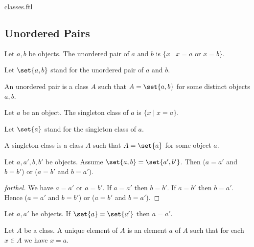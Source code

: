 \documentclass{naproche-library}
\begin{document}
\begin{smodule}{classes.ftl}
  \subsection*{Unordered Pairs}

  \begin{definition}[forthel,id=FOUNDATIONS_01_3471035364016128]
    Let $a, b$ be objects.
    The unordered pair of $a$ and $b$ is $\{ x \mid x = a$ or $x = b \}$.

    Let $\set{a, b}$ stand for the unordered pair of $a$ and $b$.
  \end{definition}

  \begin{definition}[forthel,id=FOUNDATIONS_01_605432672419840]
    An unordered pair is a class $A$ such that $A = \set{a, b}$ for some distinct objects $a, b$.
  \end{definition}

  \begin{definition}[forthel,id=FOUNDATIONS_01_1160414603771904]
    Let $a$ be an object.
    The singleton class of $a$ is $\{ x \mid x = a \}$.

    Let $\set{a}$ stand for the singleton class of $a$.
  \end{definition}

  \begin{definition}[forthel,id=FOUNDATIONS_01_6786618161627136]
    A singleton class is a class $A$ such that $A = \set{a}$ for some object $a$.
  \end{definition}

  \begin{proposition}[forthel,id=FOUNDATIONS_01_6125259604361216]
    Let $a, a', b, b'$ be objects.
    Assume $\set{a, b} = \set{a', b'}$.
    Then ($a = a'$ and $b = b'$) or ($a = b'$ and $b = a'$).
  \end{proposition}
  \begin{proof}[forthel]
    We have $a = a'$ or $a = b'$.
    If $a = a'$ then $b = b'$.
    If $a = b'$ then $b = a'$.
    Hence ($a = a'$ and $b = b'$) or ($a = b'$ and $b = a'$).
  \end{proof}

  \begin{corollary}[forthel,id=FOUNDATIONS_01_6954678910713856]
    Let $a, a'$ be objects.
    If $\set{a} = \set{a'}$ then $a = a'$.
  \end{corollary}

  \begin{definition}[forthel,id=FOUNDATIONS_01_29867480293464351]
    Let $A$ be a class.
    A unique element of $A$ is an element $a$ of $A$ such that for each $x \in A$ we have $x = a$.
  \end{definition}


\end{smodule}
\end{document}
